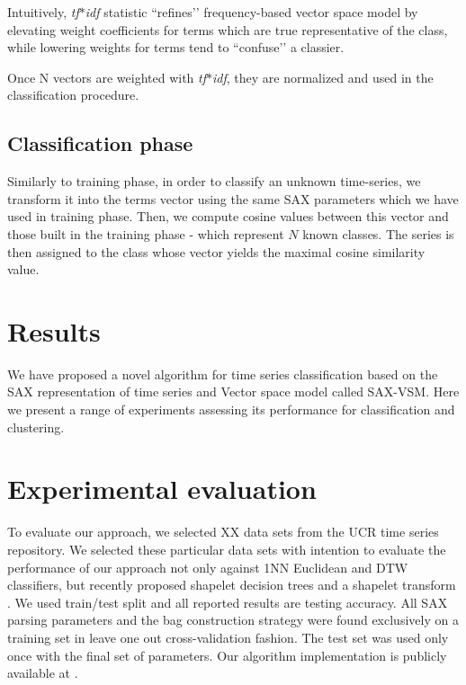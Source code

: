 \documentclass{llncs}
\begin{document}
Intuitively, \textit{tf$\ast$idf} statistic ``refines’’ frequency-based vector space model by
elevating weight coefficients for terms which are true representative of the class, while lowering
weights for terms tend to ``confuse’’ a classier.

Once N vectors are weighted with \textit{tf$\ast$idf}, they are normalized and used in the
classification procedure.

\subsection{Classification phase}
Similarly to training phase, in order to classify an unknown time-series, we transform it into the
terms vector using the same SAX parameters which we have used in training phase. Then, we compute
cosine values between this vector and those built in the training phase - which represent $N$ known
classes. The series is then assigned to the class whose vector yields the maximal cosine similarity
value.

\section{Results}
We have proposed a novel algorithm for time series classification based on the SAX
representation of time series and Vector space model called SAX-VSM. Here we present a range of
experiments assessing its performance for classification and clustering.

\section{Experimental evaluation}
To evaluate our approach, we selected XX data sets from the UCR time series repository.
We selected these particular data sets with intention to evaluate the performance of our approach
not only against 1NN Euclidean and DTW classifiers, but recently proposed shapelet decision trees
and a shapelet transform \cite{bagnal}.
We used train/test split and all reported results are testing accuracy. All SAX parsing parameters
and the bag construction strategy were found exclusively on a training set in leave one out 
cross-validation fashion. The test set was used only once with the final set of parameters. 
Our algorithm implementation is publicly available at \cite{jmotif}.
\end{document}
